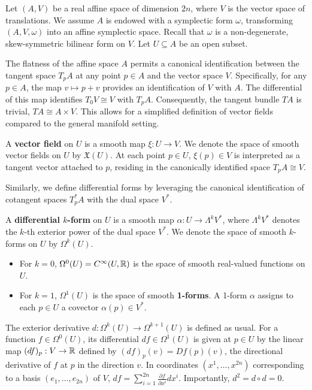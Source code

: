Let $(A, V)$ be a real affine space of dimension $2n$, where $V$ is the vector space of translations. We assume $A$ is endowed with a symplectic form $\omega$, transforming $(A, V, \omega)$ into an affine symplectic space. Recall that $\omega$ is a non-degenerate, skew-symmetric bilinear form on $V$. Let $U \subseteq A$ be an open subset.

The flatness of the affine space $A$ permits a canonical identification between the tangent space $T_p A$ at any point $p \in A$ and the vector space $V$. Specifically, for any $p \in A$, the map $v \mapsto p+v$ provides an identification of $V$ with $A$. The differential of this map identifies $T_0 V \cong V$ with $T_p A$. Consequently, the tangent bundle $TA$ is trivial, $TA \cong A \times V$. This allows for a simplified definition of vector fields compared to the general manifold setting.

\begin{definition}
A \textbf{vector field} on $U$ is a smooth map $\xi: U \to V$. We denote the space of smooth vector fields on $U$ by $\mathfrak{X}(U)$. At each point $p \in U$, $\xi(p) \in V$ is interpreted as a tangent vector attached to $p$, residing in the canonically identified space $T_p A \cong V$.
\end{definition}

Similarly, we define differential forms by leveraging the canonical identification of cotangent spaces $T^*_p A$ with the dual space $V^*$.

\begin{definition}
A \textbf{differential $k$-form} on $U$ is a smooth map $\alpha: U \to \Lambda^k V^*$, where $\Lambda^k V^*$ denotes the $k$-th exterior power of the dual space $V^*$. We denote the space of smooth $k$-forms on $U$ by $\Omega^{k}(U)$.
\begin{itemize}
    \item For $k=0$, $\Omega^{0}(U) = C^\infty(U, \mathbb{R})$ is the space of smooth real-valued functions on $U$.
    \item For $k=1$, $\Omega^{1}(U)$ is the space of smooth \textbf{1-forms}. A 1-form $\alpha$ assigns to each $p \in U$ a covector $\alpha(p) \in V^*$.
\end{itemize}
\end{definition}

\begin{remark}
The exterior derivative $d: \Omega^{k}(U) \to \Omega^{k+1}(U)$ is defined as usual. For a function $f \in \Omega^{0}(U)$, its differential $d f \in \Omega^{1}(U)$ is given at $p \in U$ by the linear map $(d f)_p: V \to \mathbb{R}$ defined by $(d f)_p(v) = Df(p)(v)$, the directional derivative of $f$ at $p$ in the direction $v$. In coordinates $(x^1, \dots, x^{2n})$ corresponding to a basis $(e_1, \dots, e_{2n})$ of $V$, $d f = \sum_{i=1}^{2n} \frac{\partial f}{\partial x^i} d x^i$. Importantly, $d^2 = d \circ d = 0$.
\end{remark}

